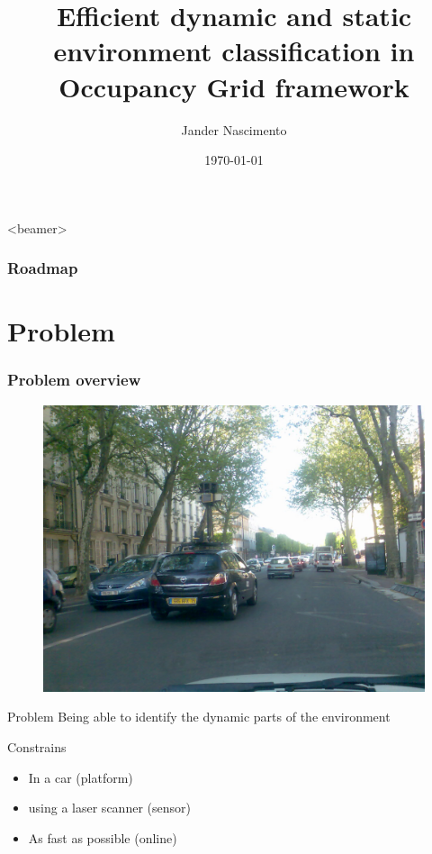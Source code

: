 \documentclass{beamer}
\title[Fast classification]{Efficient dynamic and static environment classification in Occupancy Grid framework}
\author{Jander Nascimento}
\institute{Université Joseph Fourier / INRIA}
\date{\today}
\begin{document}
\begin{frame}
\titlepage
\end{frame}

{
  \begin{frame}<beamer>
    \frametitle{Roadmap}
    \tableofcontents%
  \end{frame}
}

\section{Problem}

	\begin{frame}
		\frametitle{Problem overview}
		\begin{figure}[h]
			\center
			\includegraphics[scale=0.1]{img/fig:street:urban}
		 \end{figure}
		 
		\begin{block}{Problem}
			 Being able to identify the dynamic parts of the environment
		\end{block}
		 
		Constrains
		\begin{itemize}
			\item In a car (platform)
			\item using a laser scanner (sensor)
			\item As fast as possible (online)
		\end{itemize}

	\end{frame}
\end{document}
